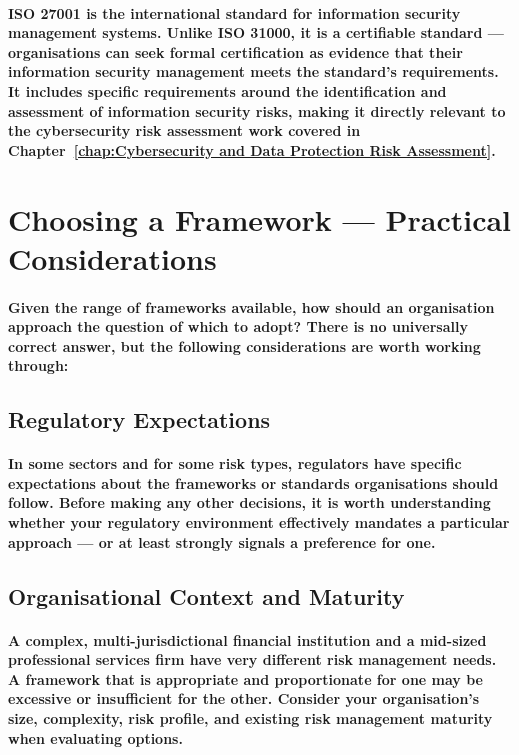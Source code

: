 \paragraph{\textbf{ISO 27001} is the international standard for information security management systems. Unlike ISO 31000, it is a certifiable standard — organisations can seek formal certification as evidence that their information security management meets the standard's requirements. It includes specific requirements around the identification and assessment of information security risks, making it directly relevant to the cybersecurity risk assessment work covered in Chapter~\ref{chap:Cybersecurity and Data Protection Risk Assessment}.}

\section{Choosing a Framework — Practical Considerations}
\paragraph{Given the range of frameworks available, how should an organisation approach the question of which to adopt? There is no universally correct answer, but the following considerations are worth working through:}
\subsection{Regulatory Expectations}
\paragraph{In some sectors and for some risk types, regulators have specific expectations about the frameworks or standards organisations should follow. Before making any other decisions, it is worth understanding whether your regulatory environment effectively mandates a particular approach — or at least strongly signals a preference for one.}
\subsection{Organisational Context and Maturity}
\paragraph{A complex, multi-jurisdictional financial institution and a mid-sized professional services firm have very different risk management needs. A framework that is appropriate and proportionate for one may be excessive or insufficient for the other. Consider your organisation's size, complexity, risk profile, and existing risk management maturity when evaluating options.}
